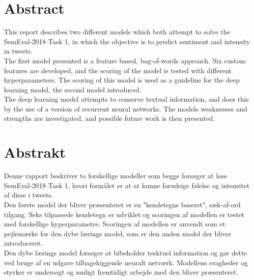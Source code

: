 
\section*{Abstract}
This report describes two different models which both attempt to solve the SemEval-2018 Task 1, in which the objective is to predict sentiment and intensity in tweets.\\
The first model presented is a feature based, bag-of-words approach. Six custom features are developed, and the scoring of the model is tested with different hyperparameters. The scoring of this model is used as a guideline for the deep learning model, the second model introduced.\\
The deep learning model attempts to conserve textual information, and does this by the use of a version of recurrent neural networks. The models weaknesses and strengths are investigated, and possible future work is then presented. 

\section*{Abstrakt}
Denne rapport beskriver to forskellige modeller som begge forsøger at løse SemEval-2018 Task 1, hvori formålet er at at kunne forudsige følelse og intensitet af disse i tweets.\\
Den første model der bliver præsenteret er en "kendetegns baseret", sæk-af-ord tilgang. Seks tilpassede kendetegn er udviklet og scoringen af modellen er testet med forskellige hyperparametre. Scoringen af modellen er anvendt som et pejlemærke for den dybe lærings model, som er den anden model der bliver introduceret.\\
Den dybe lærings model forsøger at bibeholder tesktuel information og gør dette ved bruge af en udgave tilbagekiggende neuralt netværk. Modellens svagheder og styrker er undersøgt og muligt fremtidigt arbejde med den bliver præsenteret. 